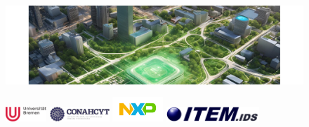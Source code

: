 {
	\begin{frame}
		\begin{figure}
			\includegraphics[width=\textwidth]{slides/figures/cover_image.pdf}
		\end{figure}
		\titlepage %
		\vfill %
		
    \begin{figure}
	\centering %
	\begin{minipage}[b]{0.24\linewidth} %
		\includegraphics[height=1.5em,keepaspectratio]{../figures/UHB_Logo_4c.pdf} %
	\end{minipage}
	\hfill %
	\begin{minipage}[b]{0.24\linewidth} %
		\includegraphics[height=1.5em,keepaspectratio]{../figures/conahcyt.pdf} %
	\end{minipage}
	\hfill %
\begin{minipage}[b]{0.24\linewidth} %
	\includegraphics[height=2.5em,keepaspectratio]{../figures/NXP_Logo_RGB_Colour.png} %
\end{minipage}
	\hfill %
	\begin{minipage}[b]{0.24\linewidth} %
		\includegraphics[height=1.5em,keepaspectratio]{../figures/logo_item_ids.png} %
	\end{minipage}

\end{figure}
		
		\addtocounter{framenumber}{-1} %
	\end{frame}
}
